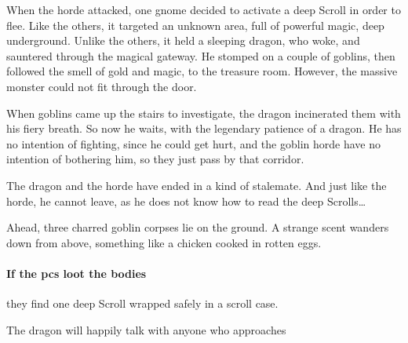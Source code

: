 \begin{multicols}{2}

\begin{exampletext}
  When the horde attacked, one gnome decided to activate a \Gls{deep} Scroll in order to flee.
  Like the others, it targeted an unknown area, full of powerful magic, deep underground.
  Unlike the others, it held a sleeping dragon, who woke, and sauntered through the magical gateway.
  He stomped on a couple of goblins, then followed the smell of gold and magic, to the treasure room.
  However, the massive monster could not fit through the door.

  When goblins came up the stairs to investigate, the dragon incinerated them with his fiery breath.
  So now he waits, with the legendary patience of a dragon.
  He has no intention of fighting, since he could get hurt, and the goblin horde have no intention of bothering him, so they just pass by that corridor.

  The dragon and the horde have ended in a kind of stalemate.
  And just like the horde, he cannot leave, as he does not know how to read the \Gls{deep} Scrolls\ldots
\end{exampletext}

\begin{boxtext}
  Ahead, three charred goblin corpses lie on the ground.
  A strange scent wanders down from above, something like a chicken cooked in rotten eggs.
\end{boxtext}

\paragraph{If the \glspl{pc} loot the bodies}
they find one \Gls{deep} Scroll wrapped safely in a scroll case.


The dragon will happily talk with anyone who approaches%
\iftoggle{hardcore}{, although he only speaks Gnollish and Elvish.}{
  The dragon's eventual goal is to obtain the rest of the treasure, then leave the \gls{warren}, and go somewhere he can spread his wings.
  Like all dragons, he has more cunning than ferocity, and \emph{plenty} of both.
  He will look for opportunities to turn the \glspl{pc} against each other, and reframe all conversations around the assumption that he will soon leave, with most of the treasure, through a \gls{deep} scroll, and that the \glspl{pc} should view this as their best possible outcome.

}
\end{multicols}
